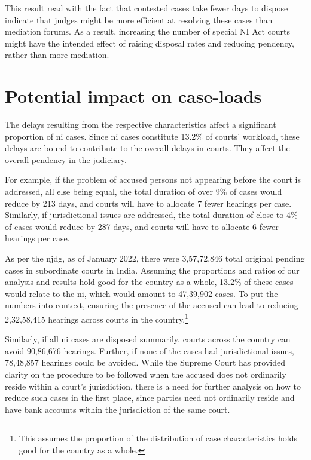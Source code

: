 \documentclass[11pt,a4paper]{article}
\begin{document}
This result read with the fact that contested cases take fewer days to dispose indicate that judges might be more efficient at resolving these cases than mediation forums. As a result, increasing the number of special NI Act courts might have the intended effect of raising disposal rates and reducing pendency, rather than more mediation.

\section{Potential impact on case-loads} \label{sec:impact-case-loads}

The delays resulting from the respective characteristics affect a significant proportion of \gls{ni} cases. Since \gls{ni} cases constitute 13.2\% of courts' workload, these delays are bound to contribute to the overall delays in courts. They affect the overall pendency in the judiciary. 

For example, if the problem of accused persons not appearing before the court is addressed, all else being equal, the total duration of over 9\% of cases would reduce by 213 days, and courts will have to allocate 7 fewer hearings per case. Similarly, if jurisdictional issues are addressed, the total duration of close to 4\% of cases would reduce by 287 days, and courts will have to allocate 6 fewer hearings per case.

As per the \gls{njdg}, as of January 2022, there were 3,57,72,846 total original pending cases in subordinate courts in India. Assuming the proportions and ratios of our analysis and results hold good for the country as a whole, 13.2\% of these cases would relate to the \gls{ni}, which would amount to 47,39,902 cases. To put the numbers into context, ensuring the presence of the accused can lead to reducing 2,32,58,415 hearings across courts in the country.\footnote{This assumes the proportion of the distribution of case characteristics holds good for the country as a whole.}

Similarly, if all \gls{ni} cases are disposed summarily, courts across the country can avoid 90,86,676 hearings. Further, if none of the cases had jurisdictional issues, 78,48,857 hearings could be avoided. While the Supreme Court has provided clarity on the procedure to be followed when the accused does not ordinarily reside within a court's jurisdiction, there is a need for further analysis on how to reduce such cases in the first place, since parties need not ordinarily reside and have bank accounts within the jurisdiction of the same court.
\end{document}
